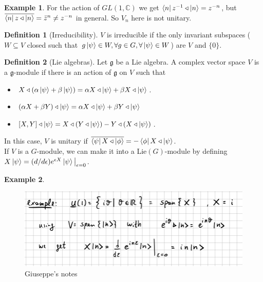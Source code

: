 \documentclass{book}
\theoremstyle{definition}
\newtheorem{defn}{Definition}[section]
\newtheorem{exmp}{Example}[section]
\newcommand{\C}{\mathbb{C}}
\newcommand{\al}{\alpha}
\newcommand{\ep}{\epsilon}
\begin{document}
\begin{exmp}
	For the action of $GL(1,\C)$ we get $\bra{n}z^{-1}\triangleleft \ket{n} = z^{-n}$, but $\overline{\bra{n} z\triangleleft\ket{n}} = \bar{z}^n \neq z^{-n}$ in general. So $V_n$ here is not unitary.
\end{exmp}


\begin{defn}[Irreducibility]
	$V$ is irreducible if the only invariant subspaces ($W\subseteq V$ closed such that $g\ket{\psi} \in W, \forall g\in G, \forall \ket{\psi} \in W$) are $V$ and $\{0\}$.  
\end{defn}



\begin{defn}[Lie algebras]
	Let $\mathfrak{g}$ be a Lie algebra. A complex vector space $V$ is a $\mathfrak{g}$-module if there is an action of $\mathfrak{g}$ on $V$ such that
	\begin{itemize}
		\item  $X\triangleleft(\al\ket{\psi} + \beta\ket{\psi}) =\al X\triangleleft\ket{\psi} + \beta X\triangleleft\ket{\psi}$.
		
		\item $(\al X + \beta Y)\triangleleft\ket{\psi} = \al X\triangleleft\ket{\psi} + \beta Y\triangleleft\ket{\psi}$
		
		\item $[X,Y]\triangleleft\ket{\psi} = X\triangleleft(Y\triangleleft\ket{\psi}) - Y\triangleleft(X\triangleleft\ket{\psi})$.
	\end{itemize}
\end{defn}

In this case, $V$ is unitary if $\overline{\bra{\psi} X\triangleleft\ket{\phi}} = -\bra{\phi} X \triangleleft \ket{\psi}$.\\

If $V$ is a $G$-module, we can make it into a Lie$(G)$-module by defining $X\ket{\psi} = (d/d\ep) e^{\ep X} \ket{\psi}\big\vert_{\ep=0}$. 

\begin{exmp}
	\begin{figure}[!htb]
		\centering
		\includegraphics[scale=0.4]{lie4}
		\caption{Giuseppe's notes}
	\end{figure}
\end{exmp}
\end{document}
